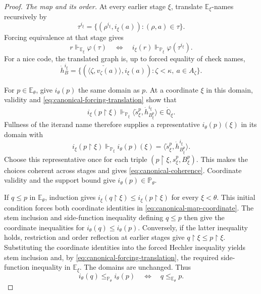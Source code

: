 \documentclass[11pt,a4paper]{amsart}
\theoremstyle{definition}
\theoremstyle{remark}
\newcommand{\PP}{\mathbb P}
\newcommand{\EE}{\mathbb E}
\begin{document}
\begin{proof}
\emph{The map and its order.}
At every earlier stage \(\xi\), translate
\(\EE_\xi\)-names recursively by
\[
 \tau^{i_\xi}=
 \{(\rho^{i_\xi},i_\xi(a)):(\rho,a)\in\tau\}.
\]
Forcing equivalence at that stage gives
\begin{equation}\label{eq:canonical-forcing-translation}
 r\Vdash_{\EE_\xi}\varphi(\tau)
 \quad\Longleftrightarrow\quad
 i_\xi(r)\Vdash_{\PP_\xi}\varphi(\tau^{i_\xi}).
\end{equation}
For a nice code, the translated graph is, up to forced
equality of check names,
\[
 \dot h_B^{i_\xi}=
 \{(\check{\langle\zeta,v_\zeta(a)\rangle},i_\xi(a)):
                         \zeta<\kappa,\ a\in A_\zeta\}.
\]

For \(p\in\EE_\theta\), give \(i_\theta(p)\) the
same domain as \(p\). At a coordinate \(\xi\) in
this domain, validity and
\eqref{eq:canonical-forcing-translation} show that
\[
 i_\xi(p\restriction\xi)\Vdash_{\PP_\xi}
  \langle\check s_\xi^p,\dot h_{B_\xi^p}^{i_\xi}\rangle
                                      \in\dot{\mathbb Q}_\xi.
\]
Fullness of the iterand name therefore supplies a
representative \(i_\theta(p)(\xi)\) in its domain with
\begin{equation}\label{eq:canonical-map-coordinate}
 i_\xi(p\restriction\xi)\Vdash_{\PP_\xi}
 i_\theta(p)(\xi)=
       \langle\check s_\xi^p,\dot h_{B_\xi^p}^{i_\xi}\rangle.
\end{equation}
Choose this representative once for each triple
\((p\restriction\xi,s_\xi^p,B_\xi^p)\). This makes
the choices coherent across stages and gives
\eqref{eq:canonical-coherence}. Coordinate validity and
the support bound give \(i_\theta(p)\in\PP_\theta\).

If \(q\leq p\) in \(\EE_\theta\), induction gives
\(i_\xi(q\restriction\xi)\leq
i_\xi(p\restriction\xi)\) for every \(\xi<\theta\).
This initial condition forces both coordinate identities
in \eqref{eq:canonical-map-coordinate}. The stem inclusion
and side-function inequality defining \(q\leq p\) then
give the coordinate inequalities for
\(i_\theta(q)\leq i_\theta(p)\). Conversely, if the
latter inequality holds, restriction and order reflection
at earlier stages give
\(q\restriction\xi\leq p\restriction\xi\).
Substituting the coordinate identities into the forced
Hechler inequality yields stem inclusion and, by
\eqref{eq:canonical-forcing-translation}, the required
side-function inequality in \(\EE_\xi\). The domains
are unchanged. Thus
\begin{equation}\label{eq:canonical-order-reflection}
 i_\theta(q)\leq_{\PP_\theta}i_\theta(p)
              \quad\Longleftrightarrow\quad
 q\leq_{\EE_\theta}p.
\end{equation}


\end{proof}
\end{document}
